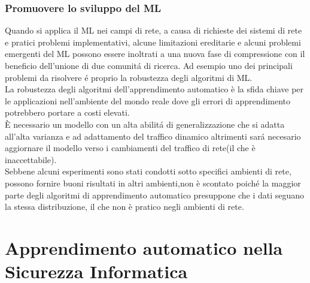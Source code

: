 \documentclass[../tesi.tex]{subfiles}
\begin{document}
\subsubsection{Promuovere lo sviluppo del ML}

Quando si applica il ML nei campi di rete, a causa di richieste dei sistemi di rete e pratici problemi implementativi, alcune limitazioni ereditarie e alcuni problemi emergenti del ML possono essere inoltrati a una nuova fase di compressione con il beneficio dell’unione di due comunitá di ricerca.
Ad esempio uno dei principali problemi da risolvere é proprio la robustezza degli algoritmi di ML.\\ 
La robustezza degli algoritmi dell’apprendimento automatico è la sfida chiave per le applicazioni nell’ambiente del mondo reale dove gli errori di apprendimento potrebbero portare a costi elevati.\\
È necessario un modello con un alta abilitá di generalizzazione che si adatta all’alta varianza e ad adattamento del traffico dinamico altrimenti sará necesario aggiornare il modello verso i cambiamenti del traffico di rete(il che è inaccettabile).\\
Sebbene alcuni esperimenti sono stati condotti sotto specifici ambienti di rete, possono fornire buoni risultati in altri ambienti,non è scontato poiché la maggior parte degli algoritmi di apprendimento automatico presuppone che i dati seguano la stessa distribuzione, il che non è pratico negli ambienti di rete.
\cite{wang2017machine,ridwan2021applications}
\newpage
\section{Apprendimento automatico nella Sicurezza Informatica}
\end{document}
